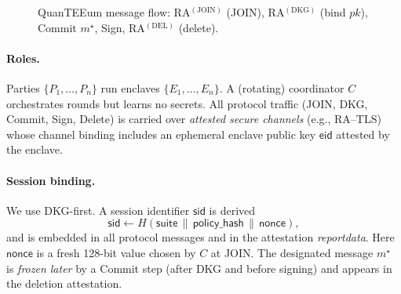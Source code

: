 \documentclass[runningheads,orivec]{llncs}
\newcommand{\RA}{\mathsf{RA}}
\begin{document}
\begin{figure}[!htbp]
\caption{QuanTEEum message flow: RA$^{(\mathrm{JOIN})}$ (JOIN), RA$^{(\mathrm{DKG})}$ (bind $pk$), Commit $m^{\star}$, Sign, RA$^{(\mathrm{DEL})}$ (delete).}
\label{fig:flow}
\end{figure}

\paragraph{Roles.}
Parties $\{P_1,\dots,P_n\}$ run enclaves $\{E_1,\dots,E_n\}$.
A (rotating) coordinator $C$ orchestrates rounds but learns no secrets.
All protocol traffic (JOIN, DKG, Commit, Sign, Delete) is carried over
\emph{attested secure channels} (e.g., RA–TLS) whose channel binding includes an
ephemeral enclave public key $\mathsf{eid}$ attested by the enclave.

\paragraph{Session binding.}
We use DKG-first. A session identifier $\mathsf{sid}$ is derived
\[
  \mathsf{sid} \gets H(\mathsf{suite}\,\|\,\mathsf{policy\_hash}\,\|\,\mathsf{nonce}),
\]
and is embedded in all protocol messages and in the attestation \emph{reportdata}.
Here $\mathsf{nonce}$ is a fresh 128-bit value chosen by $C$ at JOIN.
The designated message $m^{\star}$ is \emph{frozen later} by a Commit step
(after DKG and before signing) and appears in the deletion attestation.
\end{document}
